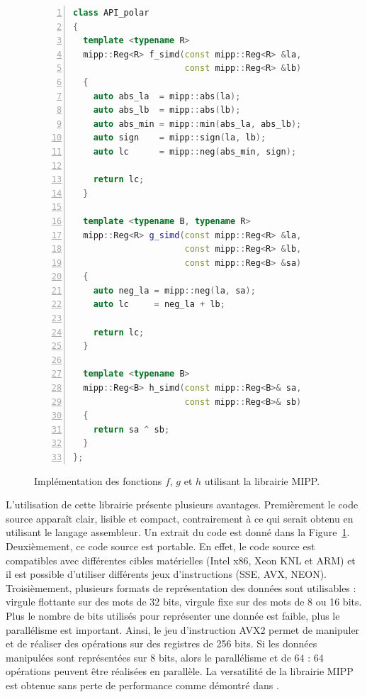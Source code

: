   \lstset{linewidth=0.7\textwidth, xleftmargin=0.025\textwidth, xrightmargin=0.05\textwidth}

  \begin{figure}[t]
  \begin{lstlisting}[language=C++, numbers=left, numbersep=0.3em, tabsize=2, basicstyle=\footnotesize\ttfamily]
class API_polar
{
  template <typename R>
  mipp::Reg<R> f_simd(const mipp::Reg<R> &la,
                      const mipp::Reg<R> &lb)
  {
    auto abs_la  = mipp::abs(la);
    auto abs_lb  = mipp::abs(lb);
    auto abs_min = mipp::min(abs_la, abs_lb);
    auto sign    = mipp::sign(la, lb);
    auto lc      = mipp::neg(abs_min, sign);

    return lc;
  }

  template <typename B, typename R>
  mipp::Reg<R> g_simd(const mipp::Reg<R> &la,
                      const mipp::Reg<R> &lb,
                      const mipp::Reg<B> &sa)
  {
    auto neg_la = mipp::neg(la, sa);
    auto lc     = neg_la + lb;

    return lc;
  }

  template <typename B>
  mipp::Reg<B> h_simd(const mipp::Reg<B>& sa,
                      const mipp::Reg<B>& sb)
  {
    return sa ^ sb;
  }
};
  \end{lstlisting}
  \caption{Implémentation des fonctions $f$, $g$ et $h$ utilisant la librairie MIPP.}
  \label{fig:mipp}
  \end{figure}
L'utilisation de cette librairie présente plusieurs avantages. Premièrement le code source apparaît clair, lisible et compact, contrairement à ce qui serait obtenu en utilisant le langage assembleur. Un extrait du code est donné dans la Figure~\ref{fig:mipp}. Deuxièmement, ce code source est portable. En effet, le code source est compatibles avec différentes cibles matérielles (Intel x86, Xeon KNL et ARM) et il est possible d'utiliser différents jeux d'instructions (SSE, AVX, NEON). Troisièmement, plusieurs formats de représentation des données sont utilisables : virgule flottante sur des mots de 32 bits, virgule fixe sur des mots de 8 ou 16 bits. Plus le nombre de bits utilisés pour représenter une donnée est faible, plus le parallélisme est important. Ainsi, le jeu d'instruction AVX2 permet de manipuler et de réaliser des opérations sur des registres de 256 bits. Si les données manipulées sont représentées sur 8 bits, alors le parallélisme et de 64 : 64 opérations peuvent être réalisées en parallèle. La versatilité de la librairie MIPP est obtenue sans perte de performance comme démontré dans \cite{cassagne2018mipp}.

